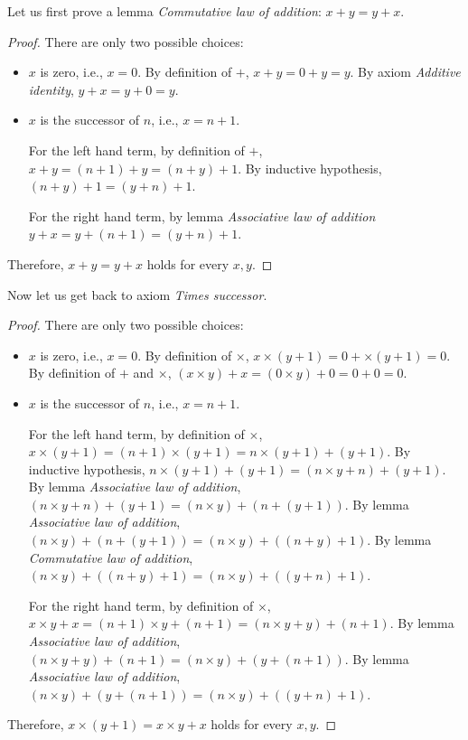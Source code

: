 \documentclass[11pt,a4paper]{article}
\begin{document}

Let us first prove a lemma \emph{Commutative law of addition}: $x + y = y + x$.

\begin{proof}
  There are only two possible choices:
  \begin{itemize}
    \item $x$ is zero, i.e., $x = 0$. By definition of $+$, $x + y = 0 + y = y$. By axiom \emph{Additive identity}, $y + x = y + 0 = y$.
    \item $x$ is the successor of $n$, i.e., $x = n + 1$.
    
    For the left hand term, by definition of $+$, $x + y = (n + 1) + y = (n + y) + 1$. By inductive hypothesis, $(n + y) + 1 = (y + n) + 1$.
    
    For the right hand term, by lemma \emph{Associative law of addition} $y + x = y + (n + 1) = (y + n) + 1$.
  \end{itemize}
  Therefore, $x + y = y + x$ holds for every $x, y$.
\end{proof}

Now let us get back to axiom \emph{Times successor}.

\begin{proof}
  There are only two possible choices:
  \begin{itemize}
    \item $x$ is zero, i.e., $x = 0$. By definition of $\times$, $x \times (y + 1) = 0 + \times (y + 1) = 0$. By definition of $+$ and $\times$, $(x \times y) + x = (0 \times y) + 0 = 0 + 0 = 0$.
    
    \item $x$ is the successor of $n$, i.e., $x = n + 1$.
    
    For the left hand term, by definition of $\times$, $x \times (y + 1) = (n + 1) \times (y + 1) = n \times (y + 1) + (y + 1)$. By inductive hypothesis, $n \times (y + 1) + (y + 1) = (n \times y + n) + (y + 1)$. By lemma \emph{Associative law of addition}, $(n \times y + n) + (y + 1) = (n \times y) + (n + (y + 1))$. By lemma \emph{Associative law of addition}, $(n \times y) + (n + (y + 1)) = (n \times y) + ((n + y) + 1)$. By lemma \emph{Commutative law of addition}, $(n \times y) + ((n + y) + 1) = (n \times y) + ((y + n) + 1)$.
    
    For the right hand term, by definition of $\times$, $x \times y + x = (n + 1) \times y + (n + 1) = (n \times y + y) + (n + 1)$. By lemma \emph{Associative law of addition}, $(n \times y + y) + (n + 1) = (n \times y) + (y + (n + 1))$. By lemma \emph{Associative law of addition}, $(n \times y) + (y + (n + 1)) = (n \times y) + ((y + n) + 1)$.
  \end{itemize}
  Therefore, $x \times (y + 1) = x \times y + x$ holds for every $x, y$.
\end{proof}

\end{document}
